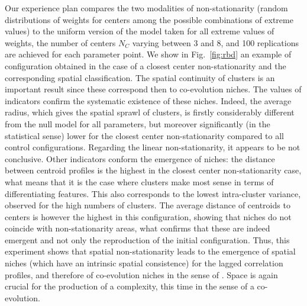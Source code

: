 \documentclass[11pt]{article}
\begin{document}
 
Our experience plan compares the two modalities of non-stationarity (random distributions of weights for centers among the possible combinations of extreme values) to the uniform version of the model taken for all extreme values of weights, the number of centers $N_C$ varying between 3 and 8, and 100 replications are achieved for each parameter point. We show in Fig.~\ref{fig:rbd} an example of configuration obtained in the case of a closest center non-stationarity and the corresponding spatial classification. The spatial continuity of clusters is an important result since these correspond then to co-evolution niches. The values of indicators confirm the systematic existence of these niches. Indeed, the average radius, which gives the spatial sprawl of clusters, is firstly considerably different from the null model for all parameters, but moreover significantly (in the statistical sense) lower for the closest center non-stationarity compared to all control configurations. Regarding the linear non-stationarity, it appears to be not conclusive. Other indicators conform the emergence of niches: the distance between centroid profiles is the highest in the closest center non-stationarity case, what means that it is the case where clusters make most sense in terms of differentiating features. This also corresponds to the lowest intra-cluster variance, observed for the high numbers of clusters. The average distance of centroids to centers is however the highest in this configuration, showing that niches do not coincide with non-stationarity areas, what confirms that these are indeed emergent and not only the reproduction of the initial configuration. Thus, this experiment shows that spatial non-stationarity leads to the emergence of spatial niches (which have an intrinsic spatial consistence) for the lagged correlation profiles, and therefore of co-evolution niches in the sense of \cite{raimbault2018caracterisation}. Space is again crucial for the production of a complexity, this time in the sense of a co-evolution.









\end{document}
